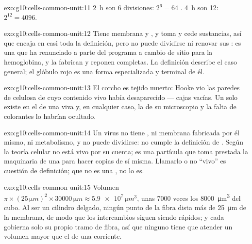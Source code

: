\begin{solution}{exo:g10:cells-common-unit:11}
\qty{2}{h} son 6 divisiones: $2^6 = 64$ . \qty{4}{h} son 12:
$2^{12} = 4096$.
\end{solution}

\begin{solution}{exo:g10:cells-common-unit:12}
Tiene membrana y , y toma y cede sustancias, así que encaja
en casi toda la definición, pero no puede dividirse ni renovar sus
: es una  que ha renunciado a parte del programa a
cambio de sitio para la hemoglobina, y la fabrican y reponen 
completas. La definición describe el caso general; el glóbulo rojo es
una forma especializada y terminal de él.
\end{solution}

\begin{solution}{exo:g10:cells-common-unit:13}
El corcho es tejido muerto: Hooke vio las paredes de celulosa de
 cuyo contenido vivo había desaparecido --- cajas vacías. Un
 solo existe en el  de una  viva y, en cualquier
caso, la  de su microscopio y la falta de colorantes lo
habrían ocultado.
\end{solution}

\begin{solution}{exo:g10:cells-common-unit:14}
Un virus no tiene , ni membrana fabricada por él mismo, ni
metabolismo, y no puede dividirse: no cumple la definición de .
Según la teoría celular no está vivo por su cuenta; es una partícula
que toma prestada la maquinaria de una  para hacer copias de sí
misma. Llamarlo o no ``vivo'' es cuestión de definición; que no es una
, no lo es.
\end{solution}

\begin{solution}{exo:g10:cells-common-unit:15}
Volumen $\pi \times (25\,\unit{\micro m})^2 \times 30000\,\unit{\micro m}
\approx \num{5.9e7}\,\unit{\micro m^3}$, unas 7000 veces los
\qty{8000}{\micro m^3} del cubo. Al ser un cilindro delgado, ningún
punto de la fibra dista más de \qty{25}{\micro m} de la membrana, de
modo que los intercambios siguen siendo rápidos; y cada  gobierna
solo su propio tramo de fibra, así que ninguno tiene que atender un
volumen mayor que el de una  corriente.
\end{solution}


